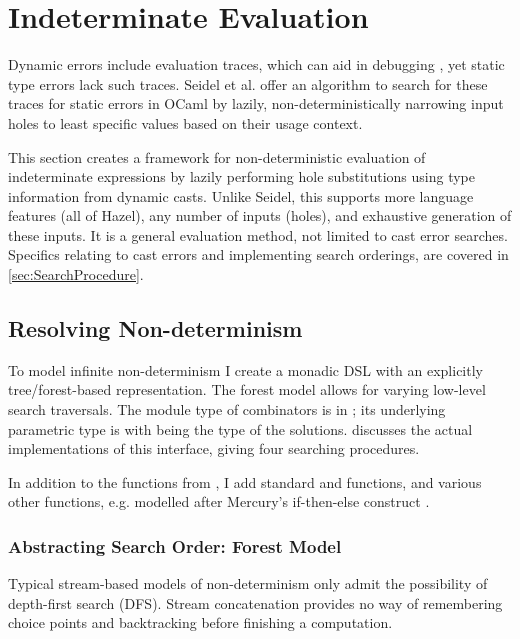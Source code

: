 \section{Indeterminate Evaluation}\label{sec:IndetEval}
Dynamic errors include evaluation traces, which can aid in debugging \cite{TraceVisualisation}, yet static type errors lack such traces. Seidel et al. \cite{SearchProc} offer an algorithm  to search for these traces for static errors in OCaml by lazily, non-deterministically narrowing input holes to least specific values based on their usage context. 

This section creates a framework for non-deterministic evaluation of indeterminate expressions by lazily performing hole substitutions using type information from dynamic casts. Unlike Seidel, this supports more language features (all of Hazel), any number of inputs (holes), and exhaustive generation of these inputs. It is a general evaluation method, not limited to cast error searches. Specifics relating to cast errors and implementing search orderings, are covered in \cref{sec:SearchProcedure}.

\subsection{Resolving Non-determinism}
\label{sec:ResolvingNondeterminism}
To model infinite non-determinism I create a monadic DSL with an explicitly tree/forest-based representation. The forest model allows for varying low-level search traversals. The module type of combinators is in ; its underlying parametric type is  with  being the type of the solutions.  discusses the actual implementations of this interface, giving four searching procedures.


In addition to the functions from , I add standard  and  functions, and various other functions, e.g.  modelled after Mercury's if-then-else construct \cite{Mercury}.

\subsubsection{Abstracting Search Order: Forest Model}
Typical stream-based models of non-determinism \cite{ListOfSuccess} only admit the possibility of depth-first search (DFS). Stream concatenation provides no way of remembering choice points and backtracking before finishing a computation. 

